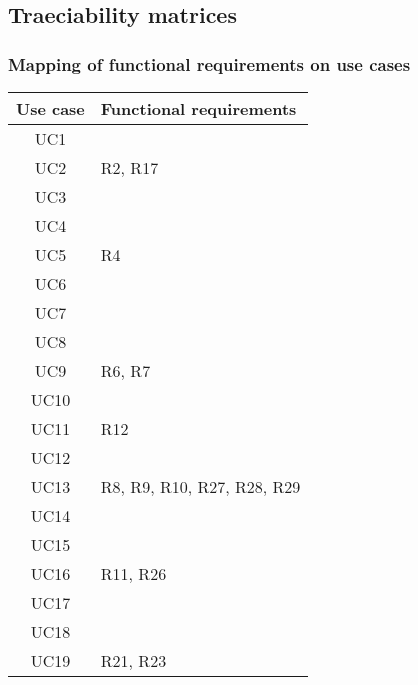 \subsection{Traeciability matrices}

\subsubsection*{Mapping of functional requirements on use cases}
\begin{center}
    \def\arraystretch{1.5}
    \begin{longtable}[H]{|c|l|}
        \hline
        \textbf{Use case} & \textbf{Functional requirements} \\ \hline
        UC1               &                                  \\ \hline
        UC2               & R2, R17                          \\ \hline
        UC3               &                                  \\ \hline
        UC4               &                                  \\ \hline
        UC5               & R4                               \\ \hline
        UC6               &                                  \\ \hline
        UC7               &                                  \\ \hline
        UC8               &                                  \\ \hline
        UC9               & R6, R7                           \\ \hline
        UC10              &                                  \\ \hline
        UC11              & R12                              \\ \hline
        UC12              &                                  \\ \hline
        UC13              & R8, R9, R10, R27, R28, R29       \\ \hline
        UC14              &                                  \\ \hline
        UC15              &                                  \\ \hline
        UC16              & R11, R26                         \\ \hline
        UC17              &                                  \\ \hline
        UC18              &                                  \\ \hline
        UC19              & R21, R23                         \\ \hline
    \end{longtable}
\end{center}

